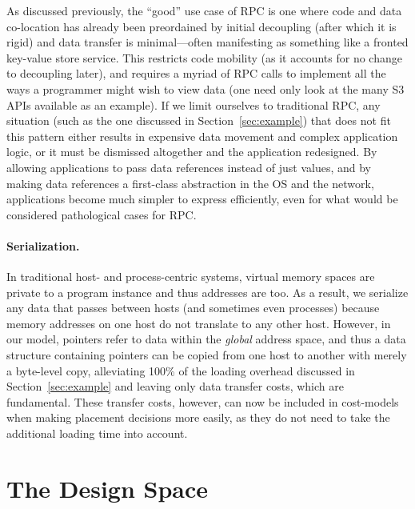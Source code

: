{        As discussed previously, the ``good'' use case of RPC is one where code and data
        co-location has already been preordained by initial decoupling (after which it is rigid) and
        data transfer is minimal---often manifesting as something like a fronted key-value store service. This restricts
        code mobility (as it accounts for no change to decoupling later), and requires a myriad of RPC calls
        to implement all the ways a programmer might wish to view data (one need only look at the many S3
        APIs available as an example).
        If we limit ourselves to traditional RPC, any situation (such as the one discussed in
        Section~\ref{sec:example}) that does not fit this pattern either results in expensive data movement
        and complex application logic, or it must be dismissed altogether and the application redesigned.
        By allowing applications to pass data references instead of just values, and by making data
        references a first-class abstraction in the OS and the network, applications become much simpler to
        express efficiently, even for what would be considered pathological cases for RPC.

        \paragraph*{Serialization.}
        In traditional host- and process-centric systems, virtual memory spaces are private to a
        program instance and thus addresses are too. As a result, we serialize any data that passes between
        hosts (and sometimes even processes) because memory addresses on one host do not translate to any
        other host. However, in our model, pointers refer to data within the \emph{global} address space,
        and thus a data structure containing pointers can be copied from one host to another with merely a
        byte-level copy, alleviating 100\% of the loading overhead discussed in Section~\ref{sec:example}
        and leaving only data transfer costs, which are fundamental. These transfer costs, however, can now
        be included in cost-models when making placement decisions more easily, as they do not need to take
        the additional loading time into account.

    }


    \section{The Design Space}



